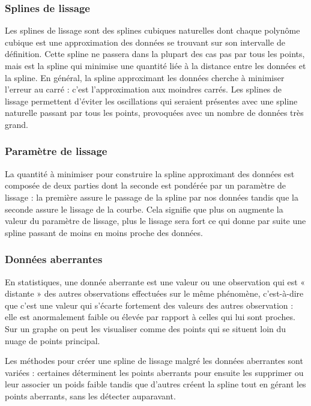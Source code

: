 \documentclass[a4paper,10pt]{article} %
\begin{document}
\subsubsection*{Splines de lissage}
Les splines de lissage sont des splines cubiques naturelles dont chaque polynôme cubique est une approximation des données se trouvant sur son intervalle de définition. Cette spline ne passera dans la plupart des cas pas par tous les points, mais est la spline qui minimise une quantité liée à la distance entre les données et la spline. En général, la spline approximant les données cherche à minimiser l'erreur au carré : c'est l'approximation aux moindres carrés. 
Les splines de lissage permettent d'éviter les oscillations qui seraient présentes avec une spline naturelle passant par tous les points, provoquées avec un nombre de données très grand.

\subsubsection*{Paramètre de lissage}
La quantité à minimiser pour construire la spline approximant des données est composée de deux parties dont la seconde est pondérée par un paramètre de lissage : la première assure le passage de la spline par nos données tandis que la seconde assure le lissage de la courbe. Cela signifie que plus on augmente la valeur du paramètre de lissage, plus le lissage sera fort ce qui donne par suite une spline passant de moins en moins proche des données.

\subsubsection*{Données aberrantes}

En statistiques, une donnée aberrante est une valeur ou une observation qui est « distante » des autres observations effectuées sur le même phénomène, c'est-à-dire que c’est une valeur qui s'écarte fortement des valeurs des autres observation : elle est anormalement faible ou élevée par rapport à celles qui lui sont proches. Sur un graphe on peut les visualiser comme des points qui se situent loin du nuage de points principal.

Les  méthodes pour créer une spline de lissage malgré les données aberrantes sont variées : certaines déterminent les points aberrants pour ensuite les supprimer ou leur associer un poids faible tandis que d'autres créent la spline tout en gérant les points aberrants, sans les détecter auparavant. 
\end{document}
